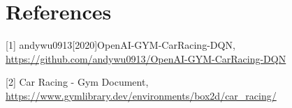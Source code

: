 \documentclass{article}
\begin{document}
\section*{References}




\small


[1] andywu0913[2020]OpenAI-GYM-CarRacing-DQN, \url{https://github.com/andywu0913/OpenAI-GYM-CarRacing-DQN}


[2] Car Racing - Gym Document, \url{https://www.gymlibrary.dev/environments/box2d/car_racing/}




\end{document}
